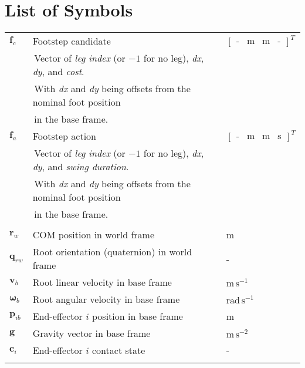 \chapter*{List of Symbols}


\begin{table}[h!]
  \centering
  \begin{tabular}{lll}
    $\mathbf f_c$ & Footstep candidate & $
    \begin{bmatrix}
      \text{-} & \text{m} & \text{m} & \text{-}
    \end{bmatrix}^T$ \\
    & \,\footnotesize{Vector of \textit{leg index} (or $-1$ for no
    leg), \textit{dx}, \textit{dy}, and \textit{cost}.} & \\
    & \,\footnotesize{With \textit{dx} and \textit{dy} being offsets
    from the nominal foot position} & \\
    & \,\footnotesize{in the base frame.} & \\
    $\mathbf f_a$ & Footstep action & $
    \begin{bmatrix}
      \text{-} & \text{m} & \text{m} & \text{s}
    \end{bmatrix}^T$ \\
    & \,\footnotesize{Vector of \textit{leg index} (or $-1$ for no
    leg), \textit{dx}, \textit{dy}, and \textit{swing duration}.} & \\
    & \,\footnotesize{With \textit{dx} and \textit{dy} being offsets
    from the nominal foot position} & \\
    & \,\footnotesize{in the base frame.} & \\
    & & \\

    $\mathbf r_w$ & COM position in world frame & m \\
    $\mathbf q_{rw}$ & Root orientation (quaternion) in world frame & - \\
    $\mathbf v_b$ & Root linear velocity in base frame &
    $\text{m}\,\text{s}^{-1}$ \\
    $\mathbf \omega_b$ & Root angular velocity in base frame &
    $\text{rad}\,\text{s}^{-1}$ \\
    $\mathbf p_{ib}$ & End-effector $i$ position in base frame & m \\
    $\mathbf g$ & Gravity vector in base frame & $\text{m}\,\text{s}^{-2}$ \\
    $\mathbf c_{i}$ & End-effector $i$ contact state & - \\
    & & \\


\end{tabular}
\end{table}
